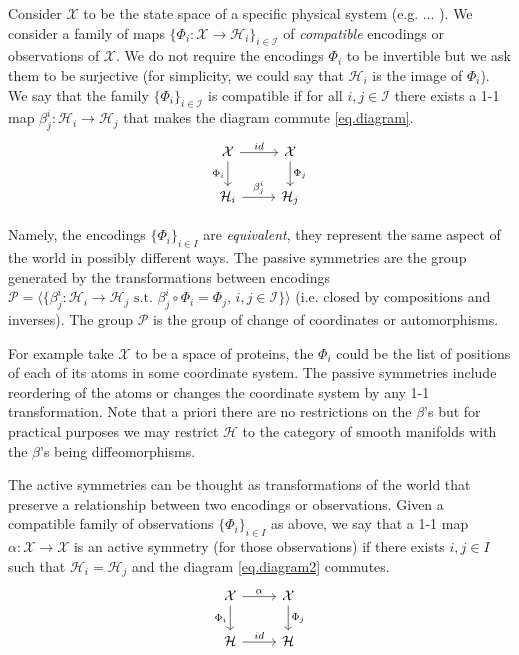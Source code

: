 \documentclass{article}
\theoremstyle{plain}
\theoremstyle{definition}
\theoremstyle{remark}
\begin{document}
Consider $\mathcal X$ to be the state space of a specific physical system (e.g. ... ). We consider a family of maps $\{\Phi_i: \mathcal X \to \mathcal H_i\}_{i\in \mathcal I}$ of \emph{compatible} encodings or observations of $\mathcal X$. We do not require the encodings $\Phi_i$ to be invertible but we ask them to be surjective (for simplicity, we could say that $\mathcal H_i$ is the image of $\Phi_i$). We say that the family $\{\Phi_i\}_{i\in \mathcal I}$ is compatible if for all $i,j \in \mathcal I$ there exists a 1-1 map $\beta_{j}^i:\mathcal H_i\to\mathcal H_j$ that makes the diagram commute \eqref{eq.diagram}.
\begin{equation}\label{eq.diagram}
\begin{tikzcd}[]
  {\cal X}\arrow[r,"id"] \arrow[d,"\Phi_i",swap] & {\cal X}  \arrow[d,"\Phi_j"]\\
{\mathcal H_i} \arrow[r,"\beta_{j}^i"]  & {\mathcal H_j} 
\end{tikzcd}
\end{equation}

Namely, the encodings $\{\Phi_i\}_{i\in I}$ are \emph{equivalent}, they represent the same aspect of the world in possibly different ways. The passive symmetries are the group generated by the transformations between encodings $\mathcal P = \langle \{\beta_{j}^i:\mathcal H_i \to \mathcal H_j \text{ s.t. } \beta_{j}^i\circ \Phi_i = \Phi_j, \, i,j\in \mathcal I \} \rangle$ (i.e. closed by compositions and inverses). The group $\mathcal P$ is the group of change of coordinates or automorphisms.


For example take $\mathcal X$ to be a space of proteins, the $\Phi_i$  could be the list of positions of each of its atoms in some coordinate system. The passive symmetries include reordering of the atoms or changes the coordinate system by any 1-1 transformation. Note that a priori there are no restrictions on the $\beta$'s but for practical purposes we may restrict $\mathcal H$ to the category of smooth manifolds with the $\beta$'s being diffeomorphisms.  

The active symmetries can be thought as transformations of the world that preserve a relationship between two encodings or observations. Given a compatible family of observations $\{\Phi_i\}_{i\in I}$ as above, we say that a 1-1 map $\alpha:\mathcal X \to \mathcal X$ is an active symmetry (for those observations) if there exists $i,j\in I$ such that $\mathcal H_i = \mathcal H_j$ and the diagram  \eqref{eq.diagram2} commutes. 
\begin{equation}\label{eq.diagram2}
\begin{tikzcd}[]
  {\cal X}\arrow[r,"\alpha"] \arrow[d,"\Phi_i",swap] & {\cal X}  \arrow[d,"\Phi_j"]\\
{\mathcal H} \arrow[r,"id"]  & {\mathcal H} 
\end{tikzcd}
\end{equation}
\end{document}
